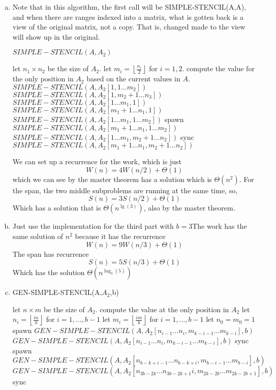 \documentclass{article}
\begin{document}
\begin{enumerate}[a.]
\item Note that in this algorithm, the first call will be SIMPLE-STENCIL(A,A), and when there are ranges indexed into a matrix, what is gotten back is a view of the original matrix, not a copy. That is, changed made to the view will show up in the original.
\begin{algorithm}
\caption{$SIMPLE-STENCIL(A,A_2)$}
\begin{algorithmic}
\State let $n_1\times n_2$ be the size of $A_2$.
\State let $m_i = \left\lfloor \frac{n_i}{2}\right\rfloor$ for $i=1,2$. 
\State compute the value for the only position in $A_2$ based on the current values in $A$.
\Else
\State $SIMPLE-STENCIL(A, A_2[1,1\ldots m_2])$
\State $SIMPLE-STENCIL(A, A_2[1,m_2+1 \ldots n_3])$
\EndIf
\Else
{}
\State $SIMPLE-STENCIL(A, A_2[1\ldots m_1,1])$
\State $SIMPLE-STENCIL(A, A_2[m_1+1 \ldots n_1,1])$
\Else
\State $SIMPLE-STENCIL(A, A_2[1\ldots m_1,1\ldots m_2])$
\State spawn $SIMPLE-STENCIL(A, A_2[ m_1+1 \ldots n_1,1\ldots m_2])$
\State  $SIMPLE-STENCIL(A, A_2[1 \ldots m_1,m_2+1 \ldots n_2])$
\State sync
\State  $SIMPLE-STENCIL(A, A_2[ m_1+1 \ldots n_1,m_2+1\ldots n_2])$
\EndIf
\EndIf
\end{algorithmic}
\end{algorithm}
We can set up a recurrence for the work, which is just
\[
W(n) = 4 W(n/2) + \Theta(1)
\]
which we can see by the master theorem has a solution which is $\Theta(n^2)$. For the span, the two middle subproblems are running at the same time, so,
\[
S(n) = 3 S(n/2) +\Theta(1)
\]
Which has a solution that is $\Theta(n^{\lg(3)})$, also by the master theorem.
\item
Just use the implementation for the third part with $b=3$The work has the same solution of $n^2$ because it has the recurrence
\[
W(n) = 9 W(n/3) + \Theta(1)
\]
The span has recurrence
\[
S(n) = 5 S(n/3) + \Theta(1)
\]
Which has the solution $\Theta(n^{\log_3(5)})$

\item
\begin{algorithm}
\caption{GEN-SIMPLE-STENCIL(A,$A_2$,b)}
\begin{algorithmic}
\State let $n\times m$ be the size of $A_2$.
\State compute the value at the only position in $A_2$
\Else
\State let $n_i = \left\lfloor \frac{in}{b}\right\rfloor$ for $i=1,\ldots, b-1$ 
\State let $m_i = \left\lfloor \frac{im}{b}\right\rfloor$ for $i=1,\ldots, b-1$
\State let $n_0 = m_0 = 1$
\State spawn $GEN-SIMPLE-STENCIL(A,A_2[n_{i-1}\ldots n_i,m_{k-i-1}\ldots m_{k-i}],b)$
\EndFor
\State $GEN-SIMPLE-STENCIL(A,A_2[n_{i-1}\ldots n_i,m_{k-i-1}\ldots m_{k-i}],b)$
\State sync
\EndFor
{}
\State spawn $GEN-SIMPLE-STENCIL(A,A_2[n_{b-k+i-1}\ldots n_{b-k+i},m_{b-i-1}\ldots m_{b-i}],b)$
\EndFor
\State $GEN-SIMPLE-STENCIL(A,A_2[n_{3b-2k}\ldots n_{3b-2k+1}i,m_{2k-2b}\ldots m_{2k-2b+1}],b)$
\State sync
\EndFor
\EndIf
\EndIf
\end{algorithmic}
\end{algorithm}


\end{enumerate}
\end{document}
